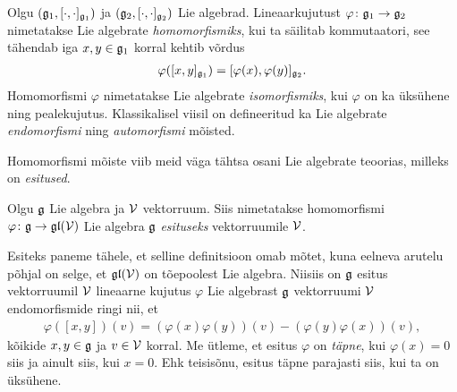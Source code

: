 Olgu $(\mathfrak{g}_1, [\cdot, \cdot]_{\mathfrak{g}_1})$ ja $(\mathfrak{g}_2, [\cdot, \cdot]_{\mathfrak{g}_2})$ Lie
algebrad. Lineaarkujutust $\varphi \colon \mathfrak{g}_1 \to \mathfrak{g}_2$ nimetatakse
Lie algebrate \emph{homomorfismiks}, kui ta säilitab kommutaatori, see
tähendab iga $x, y \in \mathfrak{g}_1$ korral kehtib võrdus
\begin{align*}
    \varphi([x, y]_{\mathfrak{g}_1}) = [\varphi(x), \varphi(y)]_{\mathfrak{g}_2}.
\end{align*}
Homomorfismi $\varphi$ nimetatakse Lie algebrate \emph{isomorfismiks},
kui $\varphi$ on ka üksühene ning pealekujutus. Klassikalisel viisil on
defineeritud ka Lie algebrate \emph{endomorfismi} ning \emph{automorfismi}
mõisted.

Homomorfismi mõiste viib meid väga tähtsa osani Lie algebrate teoorias,
milleks on \emph{esitused}.

\begin{dfn}
    Olgu $\mathfrak{g}$ Lie algebra ja $\mathcal{V}$ vektorruum. Siis nimetatakse homomorfismi
    $\varphi \colon \mathfrak{g} \to \mathfrak{gl}(\mathcal{V})$ Lie algebra $\mathfrak{g}$ \emph{esituseks}
    vektorruumile $\mathcal{V}$.
\end{dfn}

Esiteks paneme tähele, et selline definitsioon omab mõtet, kuna
eelneva arutelu põhjal on selge, et $\mathfrak{gl}(\mathcal{V})$ on tõepoolest Lie algebra.
Niisiis on $\mathfrak{g}$ esitus vektorruumil $\mathcal{V}$ lineaarne kujutus $\varphi$
Lie algebrast $\mathfrak{g}$ vektorruumi $\mathcal{V}$ endomorfismide ringi nii, et
\begin{align*}
    \varphi([x, y])(v) = \left( \varphi(x)\varphi(y) \right) (v) -
                         \left( \varphi(y)\varphi(x) \right) (v),
\end{align*}
kõikide $x, y \in \mathfrak{g}$ ja $v \in \mathcal{V}$ korral. Me ütleme, et esitus $\varphi$
on \emph{täpne}, kui $\varphi(x) = 0$ siis ja ainult siis, kui $x = 0$. Ehk
teisisõnu, esitus täpne parajasti siis, kui ta on üksühene.

